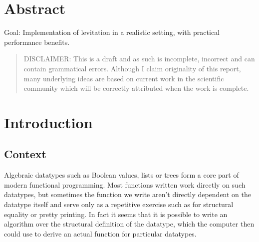 \documentclass{ituthesis}
\begin{document}

\frontmatter

\thetitlepage
\newpage

\chapter*{Abstract}
Goal: Implementation of levitation in a realistic setting, with practical performance benefits.
\blockquote{DISCLAIMER: This is a draft and as such is incomplete, incorrect and can contain grammatical errors.
Although I claim originality of this report, many underlying ideas are based on current work in the scientific community which will be correctly attributed
when the work is complete.}

\cleardoublepage
\setcounter{tocdepth}{1}
\tableofcontents

\mainmatter

\midsloppy
\sloppybottom

\chapter{Introduction}
\label{cha:Intoduction}
\section{Context}
\label{sec:Context}
Algebraic datatypes such as Boolean values, lists or trees form a core part of modern functional programming.
Most functions written work directly on such datatypes, but sometimes the function we write aren't directly dependent on the datatype itself and serve only as a repetitive exercise such as for structural equality or pretty printing.
In fact it seems that it is possible to write an algorithm over the structural definition of the datatype, which the computer then could use to derive an actual function for particular datatypes.
\end{document}
